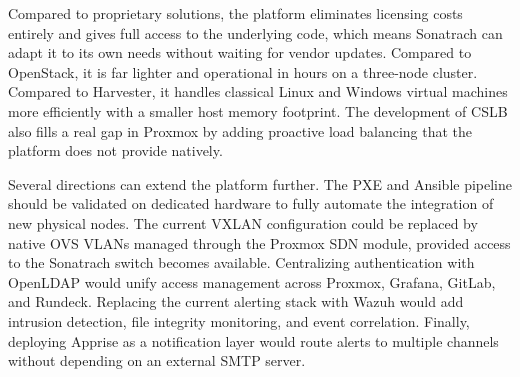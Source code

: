 \documentclass[12pt, a4paper]{article}
\begin{document}
Compared to proprietary solutions, the platform eliminates licensing costs entirely and gives full access to the underlying code, which means Sonatrach can adapt it to its own needs without waiting for vendor updates. Compared to OpenStack, it is far lighter and operational in hours on a three-node cluster. Compared to Harvester, it handles classical Linux and Windows virtual machines more efficiently with a smaller host memory footprint. The development of CSLB also fills a real gap in Proxmox by adding proactive load balancing that the platform does not provide natively.

Several directions can extend the platform further. The PXE and Ansible pipeline should be validated on dedicated hardware to fully automate the integration of new physical nodes. The current VXLAN configuration could be replaced by native OVS VLANs managed through the Proxmox SDN module, provided access to the Sonatrach switch becomes available. Centralizing authentication with OpenLDAP would unify access management across Proxmox, Grafana, GitLab, and Rundeck. Replacing the current alerting stack with Wazuh would add intrusion detection, file integrity monitoring, and event correlation. Finally, deploying Apprise as a notification layer would route alerts to multiple channels without depending on an external SMTP server.
\end{document}
